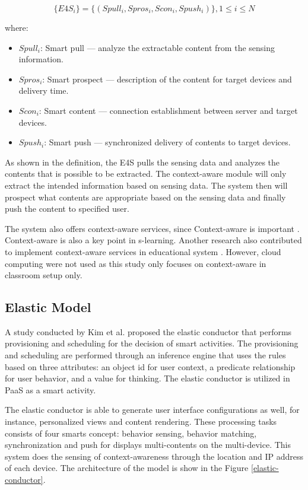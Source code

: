 \documentclass[journal]{vgtc}
\begin{document}
  \begin{equation}
    \{E4S_i\}=\{(Spull_i , Spros_i, Scon_i, Spush_i)\}, 1\leq i \leq N
  \end{equation}

  where:
  \begin{itemize}
  \setlength\itemsep{0em}
    \item[] $Spull_i$: Smart pull $—$ analyze the extractable content from the sensing information. 
    \item[] $Spros_i$: Smart prospect $—$ description of the content for target devices and delivery time.
    \item[] $Scon_i$: Smart content $—$ connection establishment between server and target devices.
    \item[] $Spush_i$: Smart push $—$ synchronized delivery of contents to target devices.
  \end{itemize}

  As shown in the definition, the E4S pulls the sensing data and analyzes the contents that is possible to be extracted. The context-aware module will only extract the intended information based on sensing data. The system then will prospect what contents are appropriate based on the sensing data and finally push the content to specified user.

  The system also offers context-aware services, since Context-aware is important \cite{Pratama2014}. Context-aware is also a key point in s-learning. Another research also contributed to implement context-aware services in educational system \cite{Scott2010}. However, cloud computing were not used as this study only focuses on context-aware in classroom setup only.

  \subsection{Elastic Model}
  A study conducted by Kim et al. \cite{Kim2013} proposed the elastic conductor that performs provisioning and scheduling for the decision of smart activities. The provisioning and scheduling are performed through an inference engine that uses the rules based on three attributes: an object id for user context, a predicate relationship for user behavior, and a value for thinking. The elastic conductor is utilized in PaaS as a smart activity.
  
  The elastic conductor is able to generate user interface configurations as well, for instance, personalized views and content rendering. These processing tasks consists of four smarts concept: behavior sensing, behavior matching, synchronization and push for displays multi-contents on the multi-device. This system does the  sensing of context-awareness through the location and IP address of each device. The architecture of the model is show in the Figure \ref{elastic-conductor}.
\end{document}
